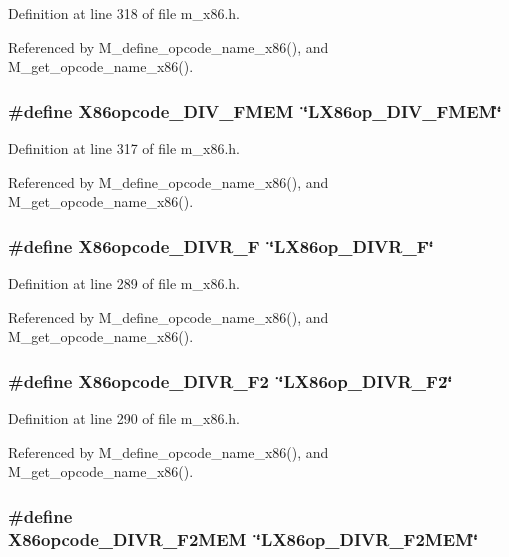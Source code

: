 Definition at line 318 of file m\_\-x86.h.

Referenced by M\_\-define\_\-opcode\_\-name\_\-x86(), and M\_\-get\_\-opcode\_\-name\_\-x86().
\subsubsection{\setlength{\rightskip}{0pt plus 5cm}\#define X86opcode\_\-DIV\_\-FMEM~\char`\"{}LX86op\_\-DIV\_\-FMEM\char`\"{}}\label{m__x86_8h_8fbb33e540eefdc585edac8e05bb9f9f}




Definition at line 317 of file m\_\-x86.h.

Referenced by M\_\-define\_\-opcode\_\-name\_\-x86(), and M\_\-get\_\-opcode\_\-name\_\-x86().
\subsubsection{\setlength{\rightskip}{0pt plus 5cm}\#define X86opcode\_\-DIVR\_\-F~\char`\"{}LX86op\_\-DIVR\_\-F\char`\"{}}\label{m__x86_8h_679d834cc460136a4041d727737b7e5e}




Definition at line 289 of file m\_\-x86.h.

Referenced by M\_\-define\_\-opcode\_\-name\_\-x86(), and M\_\-get\_\-opcode\_\-name\_\-x86().
\subsubsection{\setlength{\rightskip}{0pt plus 5cm}\#define X86opcode\_\-DIVR\_\-F2~\char`\"{}LX86op\_\-DIVR\_\-F2\char`\"{}}\label{m__x86_8h_a2731915f89f225e2fdbb1b830c1281d}




Definition at line 290 of file m\_\-x86.h.

Referenced by M\_\-define\_\-opcode\_\-name\_\-x86(), and M\_\-get\_\-opcode\_\-name\_\-x86().
\subsubsection{\setlength{\rightskip}{0pt plus 5cm}\#define X86opcode\_\-DIVR\_\-F2MEM~\char`\"{}LX86op\_\-DIVR\_\-F2MEM\char`\"{}}\label{m__x86_8h_250cb90f348dd4a723ad866c96aac549}




